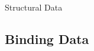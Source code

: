 \documentclass[9pt,bestpractices]{livecoms}
\begin{document}
\begin{Checklists*}[p!]
\begin{checklist}{Structural Data}
\begin{itemize}
\end{itemize}
\end{checklist}

\end{Checklists*}

\subsection{Binding Data}
\end{document}
